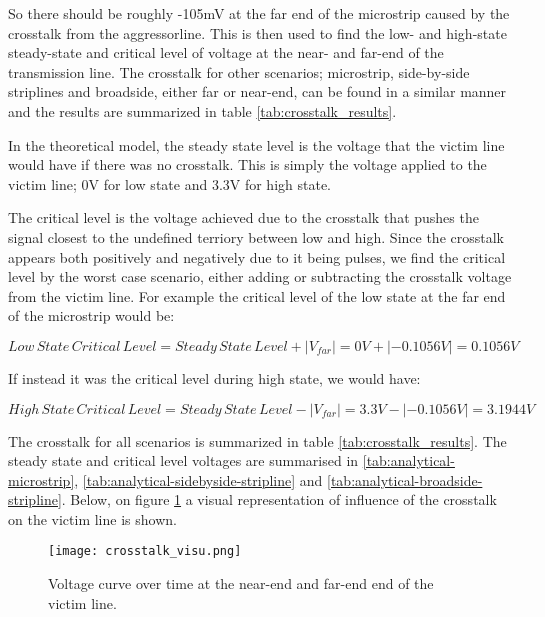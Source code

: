 \documentclass[../main.tex]{subfiles}
\begin{document}
So there should be roughly -105mV at the far end of the microstrip caused by the crosstalk from the aggressorline. This is then used to find the low- and high-state steady-state and critical level of voltage at the near- and far-end of the transmission line. The crosstalk for other scenarios; microstrip, side-by-side striplines and broadside, either far or near-end, can be found in a similar manner and the results are summarized in table \ref{tab:crosstalk_results}. 

\vspace{10pt}
In the theoretical model, the steady state level is the voltage that the victim line would have if there was no crosstalk. This is simply the voltage applied to the victim line; 0V for low state and 3.3V for high state.

\vspace{10pt}
The critical level is the voltage achieved due to the crosstalk that pushes the signal closest to the undefined terriory between low and high. Since the crosstalk appears both positively and negatively due to it being pulses, we find the critical level by the worst case scenario, either adding or subtracting the crosstalk voltage from the victim line. For example the critical level of the low state at the far end of the microstrip would be:

\begin{equation}
    Low\,State\,Critical\,Level = Steady\,State\,Level + |V_{far}| = 0 V + |-0.1056 V| = 0.1056 V
\end{equation}

If instead it was the critical level during high state, we would have:

\begin{equation}
    High\,State\,Critical\,Level = Steady\,State\,Level - |V_{far}| = 3.3 V - |-0.1056 V| = 3.1944 V
\end{equation}

\newpage

The crosstalk for all scenarios is summarized in table \ref{tab:crosstalk_results}. The steady state and critical level voltages are summarised in \ref{tab:analytical-microstrip}, \ref{tab:analytical-sidebyside-stripline} and \ref{tab:analytical-broadside-stripline}. Below, on figure \ref{fig:microstrip_voltage_curve} a visual representation of influence of the crosstalk on the victim line is shown.

\begin{figure}[h]
    \centering
    \texttt{[image: crosstalk\_visu.png]}
    \caption{Voltage curve over time at the near-end and far-end end of the victim line.}
    \label{fig:microstrip_voltage_curve}
\end{figure}
\end{document}
